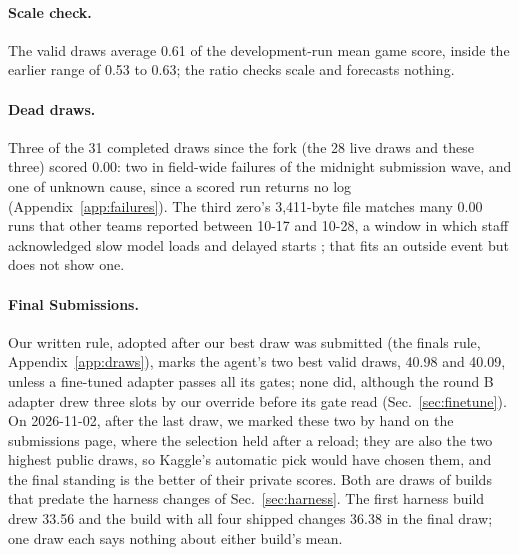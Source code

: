 \paragraph{Scale check.}
The valid draws average 0.61 of the development-run mean game score, inside the earlier range of 0.53 to 0.63; the ratio checks scale and forecasts nothing. %

\paragraph{Dead draws.}
Three of the 31 completed draws since the fork (the 28 live draws and these three) scored 0.00: two in field-wide failures of the midnight submission wave, and one of unknown cause, since a scored run returns no log (Appendix~\ref{app:failures}). The third zero's 3,411-byte file matches many 0.00 runs that other teams reported between 10-17 and 10-28, a window in which staff acknowledged slow model loads and delayed starts \citep{kaggle2026forum751598}; that fits an outside event but does not show one. %

\paragraph{Final Submissions.}
Our written rule, adopted after our best draw was submitted (the finals rule, Appendix~\ref{app:draws}), marks the agent's two best valid draws, 40.98 and 40.09, unless a fine-tuned adapter passes all its gates; none did, although the round B adapter drew three slots by our override before its gate read (Sec.~\ref{sec:finetune}). %
On 2026-11-02, after the last draw, we marked these two by hand on the submissions page, where the selection held after a reload; they are also the two highest public draws, so Kaggle's automatic pick would have chosen them, and the final standing is the better of their private scores. %
Both are draws of builds that predate the harness changes of Sec.~\ref{sec:harness}. The first harness build drew 33.56 and the build with all four shipped changes 36.38 in the final draw; one draw each says nothing about either build's mean. %
